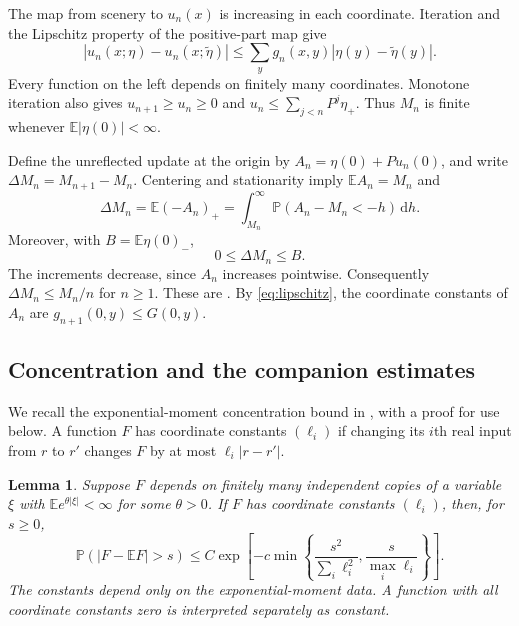 \documentclass[11pt]{amsart}
\newtheorem{lemma}[theorem]{Lemma}
\theoremstyle{remark}
\newcommand{\Pp}{\mathbb P}
\newcommand{\E}{\mathbb E}
\newcommand{\dd}{\,\mathrm d}
\begin{document}
The map from scenery to $u_n(x)$ is increasing in each coordinate.
Iteration and the Lipschitz property of the positive-part map give
\begin{equation}\label{eq:lipschitz}
 |u_n(x;\eta)-u_n(x;\widetilde\eta)|
 \le\sum_y g_n(x,y)|\eta(y)-\widetilde\eta(y)|.
\end{equation}
Every function on the left depends on finitely many coordinates.
Monotone iteration also gives $u_{n+1}\ge u_n\ge0$ and
$u_n\le\sum_{j<n}P^j\eta_+$. Thus $M_n$ is finite whenever
$\E|\eta(0)|<\infty$.

Define the unreflected update at the origin by
$A_n=\eta(0)+Pu_n(0)$, and write $\Delta M_n=M_{n+1}-M_n$.
Centering and stationarity imply $\E A_n=M_n$ and
\begin{equation}\label{eq:increment}
 \Delta M_n=\E(-A_n)_+
 =\int_{M_n}^\infty\Pp(A_n-M_n<-h)\dd h.
\end{equation}
Moreover, with $B=\E\eta(0)_-$,
\begin{equation}\label{eq:boundedinc}
 0\le\Delta M_n\le B.
\end{equation}
The increments decrease, since $A_n$ increases pointwise. Consequently
$\Delta M_n\le M_n/n$ for $n\ge1$. These are
\cite[Lemma~2.4, p.~16, and (86)--(87), p.~51]{BP}.
By \eqref{eq:lipschitz}, the coordinate constants of $A_n$ are
$g_{n+1}(0,y)\le G(0,y)$.

\subsection{Concentration and the companion estimates}
We recall the exponential-moment concentration bound in
\cite[Lemma~3.2(b), pp.~21--22]{BP}, with a proof for use below.
A function $F$ has coordinate constants $(\ell_i)$ if changing its
$i$th real input from $r$ to $r'$ changes $F$ by at most $\ell_i|r-r'|$.

\begin{lemma}\label{lem:bernstein}
Suppose $F$ depends on finitely many independent copies of a variable
$\xi$ with $\E e^{\theta|\xi|}<\infty$ for some $\theta>0$. If $F$ has
coordinate constants $(\ell_i)$, then, for $s\ge0$,
\begin{equation}\label{eq:bernstein}
 \Pp(|F-\E F|>s)\le C\exp\left[-c\min\left\{
 \frac{s^2}{\sum_i\ell_i^2},\frac{s}{\max_i\ell_i}\right\}\right].
\end{equation}
The constants depend only on the exponential-moment data. A function
with all coordinate constants zero is interpreted separately as constant.
\end{lemma}
\end{document}
